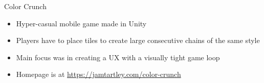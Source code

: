 \item Color Crunch
\begin{itemize}
    \item Hyper-casual mobile game made in Unity
    \item Players have to place tiles to create large consecutive chains of the same style
    \item Main focus was in creating a UX with a visually tight game loop
    \item Homepage is at \href{https://jamtartley.com/color-crunch}{https://jamtartley.com/color-crunch}
\end{itemize}
